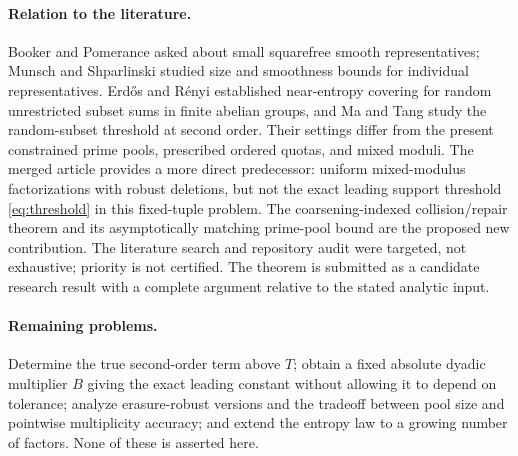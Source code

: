 \documentclass[11pt]{article}
\theoremstyle{definition}\newtheorem{remark}[theorem]{Remark}
\begin{document}
\paragraph{Relation to the literature.} Booker and Pomerance \cite{BP} asked about small squarefree smooth representatives; Munsch and Shparlinski \cite{MS} studied size and smoothness bounds for individual representatives. Erd\H{o}s and R\'enyi \cite{ER} established near-entropy covering for random unrestricted subset sums in finite abelian groups, and Ma and Tang \cite{MT} study the random-subset threshold at second order. Their settings differ from the present constrained prime pools, prescribed ordered quotas, and mixed moduli. The merged article provides a more direct predecessor: uniform mixed-modulus factorizations with robust deletions, but not the exact leading support threshold \eqref{eq:threshold} in this fixed-tuple problem. The coarsening-indexed collision/repair theorem and its asymptotically matching prime-pool bound are the proposed new contribution. The literature search and repository audit were targeted, not exhaustive; priority is not certified. The theorem is submitted as a candidate research result with a complete argument relative to the stated analytic input.

\paragraph{Remaining problems.} Determine the true second-order term above $T$; obtain a fixed absolute dyadic multiplier $B$ giving the exact leading constant without allowing it to depend on tolerance; analyze erasure-robust versions and the tradeoff between pool size and pointwise multiplicity accuracy; and extend the entropy law to a growing number of factors. None of these is asserted here.
\end{document}
